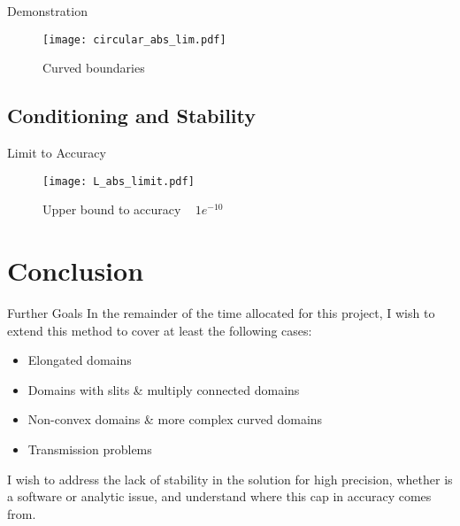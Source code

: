\documentclass[envcountsect notes]{beamer}       %
\begin{document}
\begin{frame}{Demonstration}
    \begin{figure}[t]
        \texttt{[image: circular\_abs\_lim.pdf]}
        \vspace{-3em}
        \caption*{Curved boundaries}
    \end{figure}
\end{frame}

\subsection{Conditioning and Stability}
\begin{frame}{Limit to Accuracy}
    \begin{figure}[t]
        \vspace{-1em}
        \texttt{[image: L\_abs\_limit.pdf]}
        \vspace{-3em}
        \caption*{Upper bound to accuracy ~ $1e^{-10}$}
    \end{figure}
\end{frame}


\section{Conclusion}
\begin{frame}{Further Goals}
    In the remainder of the time allocated for this project, I wish to extend this method to cover 
    at least the following cases:
    \begin{itemize}
        \item Elongated domains
        \item Domains with slits \& multiply connected domains
        \item Non-convex domains \& more complex curved domains
        \item Transmission problems
    \end{itemize}
    \vspace{1em}
    I wish to address the lack of stability in the solution for high precision, whether is a software or analytic issue, and understand where this cap in accuracy comes from.
\end{frame}

\end{document}
